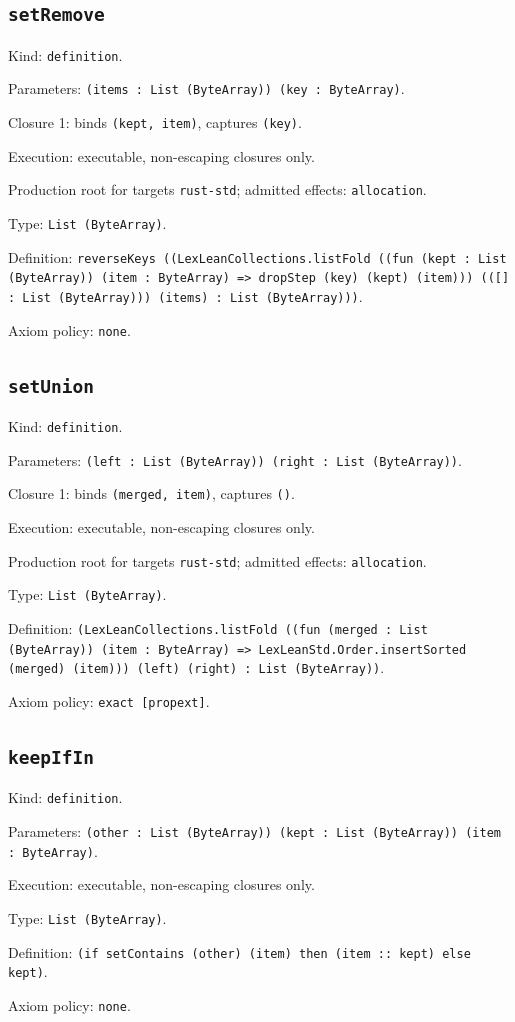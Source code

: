 \documentclass[11pt]{article}
\begin{document}
\subsection*{\texttt{setRemove}}
\noindent Kind: \texttt{definition}.\par
\noindent Parameters: \texttt{(items : List (ByteArray)) (key : ByteArray)}.\par
\noindent Closure 1: binds \texttt{(kept, item)}, captures \texttt{(key)}.\par
\noindent Execution: executable, non-escaping closures only.\par
\noindent Production root for targets \texttt{rust-std}; admitted effects: \texttt{allocation}.\par
\noindent Type: \texttt{List (ByteArray)}.\par
\noindent Definition: \texttt{reverseKeys ((LexLeanCollections.listFold ((fun (kept : List (ByteArray)) (item : ByteArray) => dropStep (key) (kept) (item))) (([] : List (ByteArray))) (items) : List (ByteArray)))}.\par
\noindent Axiom policy: \texttt{none}.\par
\subsection*{\texttt{setUnion}}
\noindent Kind: \texttt{definition}.\par
\noindent Parameters: \texttt{(left : List (ByteArray)) (right : List (ByteArray))}.\par
\noindent Closure 1: binds \texttt{(merged, item)}, captures \texttt{()}.\par
\noindent Execution: executable, non-escaping closures only.\par
\noindent Production root for targets \texttt{rust-std}; admitted effects: \texttt{allocation}.\par
\noindent Type: \texttt{List (ByteArray)}.\par
\noindent Definition: \texttt{(LexLeanCollections.listFold ((fun (merged : List (ByteArray)) (item : ByteArray) => LexLeanStd.Order.insertSorted (merged) (item))) (left) (right) : List (ByteArray))}.\par
\noindent Axiom policy: \texttt{exact [propext]}.\par
\subsection*{\texttt{keepIfIn}}
\noindent Kind: \texttt{definition}.\par
\noindent Parameters: \texttt{(other : List (ByteArray)) (kept : List (ByteArray)) (item : ByteArray)}.\par
\noindent Execution: executable, non-escaping closures only.\par
\noindent Type: \texttt{List (ByteArray)}.\par
\noindent Definition: \texttt{(if setContains (other) (item) then (item :: kept) else kept)}.\par
\noindent Axiom policy: \texttt{none}.\par
\end{document}
